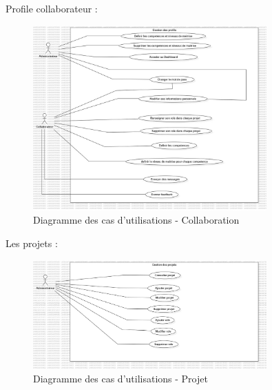 \documentclass{article}
\begin{document}
                \FloatBarrier
                
                Profile collaborateur :
                \begin{figure}[h!]
                    \centering
                    \includegraphics[width=0.8\textwidth]{assets/diagrammes/jpg/Model5!UseCaseCollab_4.jpg}
                    \caption{Diagramme des cas d'utilisations - Collaboration}
                \end{figure}
                
                \FloatBarrier
                
                Les projets :
                \begin{figure}[h!]
                    \centering
                    \includegraphics[width=0.8\textwidth]{assets/diagrammes/jpg/Model6!UseCaseProject_5.jpg}
                    \caption{Diagramme des cas d'utilisations - Projet}
                \end{figure}
                \FloatBarrier
            
\end{document}
